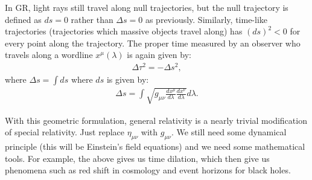 \documentclass[11pt]{article}
\newcommand{\srmetric}[0]{\eta_{\mu \nu}}
\newcommand{\grmetric}[0]{g_{\mu \nu}}
\theoremstyle{definition}
\begin{document}
In GR, light rays still travel along null trajectories, but the null trajectory is defined as \( ds = 0 \) rather than \( \Delta s = 0 \) as previously. Similarly, time-like trajectories (trajectories which massive objects travel along) has \( (ds)^2 < 0 \) for every point along the trajectory. The proper time measured by an observer who travels along a wordline \( x^\mu(\lambda) \) is again given by: 
\begin{align}
	\Delta \tau^2 = - \Delta s^2, 	
\end{align}
where \( \Delta s = \int ds \) where \( ds \) is given by:
\begin{align}
	\Delta s = \int \sqrt{\grmetric \frac{dx^\mu}{d \lambda} \frac{dx^\nu}{d \lambda}} d \lambda. 	
\end{align}

With this geometric formulation, general relativity is a nearly trivial modification of special relativity. Just replace \( \srmetric \) with \( \grmetric \). We still need some dynamical principle (this will be Einstein's field equations) and we need some mathematical tools. For example, the above gives us time dilation, which then give us phenomena such as red shift in cosmology and event horizons for black holes. 
\end{document}
